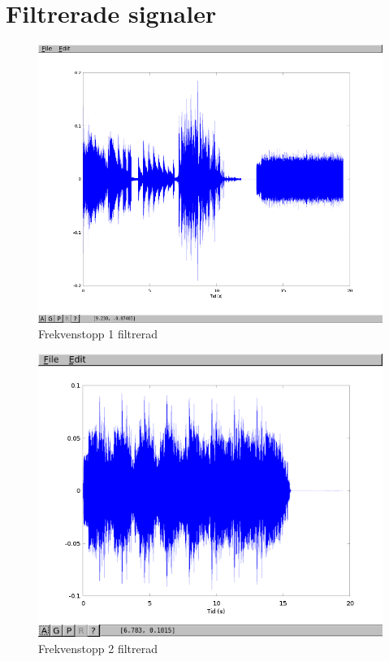 \documentclass[10pt]{article}
\begin{document}

\appendix
\pagestyle{empty}
\section{Filtrerade signaler}

\begin{figure}[htp]
  \begin{center}
  \includegraphics[keepaspectratio=true,width=\linewidth]{topp1_filter.png}  %
  \end{center}
  \caption{Frekvenstopp 1 filtrerad} %
  \label{fig:topp1_filter}
\end{figure}

\begin{figure}[htp]
  \begin{center}
  \includegraphics[keepaspectratio=true,width=\linewidth]{topp2_filter.png}  %
  \end{center}
  \caption{Frekvenstopp 2 filtrerad} %
  \label{fig:topp2_filter}
\end{figure}
\end{document}
